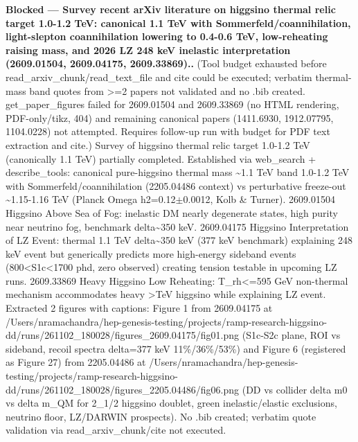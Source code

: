 \documentclass[11pt,a4paper]{article}
\begin{document}
\textbf{Blocked --- Survey recent arXiv literature on higgsino thermal relic target 1.0-1.2 TeV: canonical 1.1 TeV with Sommerfeld/coannihilation, light-slepton coannihilation lowering to 0.4-0.6 TeV, low-reheating raising mass, and 2026 LZ 248 keV inelastic interpretation (2609.01504, 2609.04175, 2609.33869)..} (Tool budget exhausted before read\_arxiv\_chunk/read\_text\_file and cite could be executed; verbatim thermal-mass band quotes from \textgreater{}=2 papers not validated and no .bib created. get\_paper\_figures failed for 2609.01504 and 2609.33869 (no HTML rendering, PDF-only/tikz, 404) and remaining canonical papers (1411.6930, 1912.07795, 1104.0228) not attempted. Requires follow-up run with budget for PDF text extraction and cite.) Survey of higgsino thermal relic target 1.0-1.2 TeV (canonically 1.1 TeV) partially completed. Established via web\_search + describe\_tools: canonical pure-higgsino thermal mass \textasciitilde{}1.1 TeV band 1.0-1.2 TeV with Sommerfeld/coannihilation (2205.04486 context) vs perturbative freeze-out \textasciitilde{}1.15-1.16 TeV (Planck Omega h2=0.12$\pm$0.0012, Kolb \& Turner). 2609.01504 Higgsino Above Sea of Fog: inelastic DM nearly degenerate states, high purity near neutrino fog, benchmark delta\textasciitilde{}350 keV. 2609.04175 Higgsino Interpretation of LZ Event: thermal 1.1 TeV delta\textasciitilde{}350 keV (377 keV benchmark) explaining 248 keV event but generically predicts more high-energy sideband events (800\textless{}S1c\textless{}1700 phd, zero observed) creating tension testable in upcoming LZ runs. 2609.33869 Heavy Higgsino Low Reheating: T\_rh\textless{}=595 GeV non-thermal mechanism accommodates heavy \textgreater{}TeV higgsino while explaining LZ event. Extracted 2 figures with captions: Figure 1 from 2609.04175 at /Users/nramachandra/hep-genesis-testing/projects/ramp-research-higgsino-dd/runs/261102\_180028/figures\_2609.04175/fig01.png (S1c-S2c plane, ROI vs sideband, recoil spectra delta=377 keV 11\%/36\%/53\%) and Figure 6 (registered as Figure 27) from 2205.04486 at /Users/nramachandra/hep-genesis-testing/projects/ramp-research-higgsino-dd/runs/261102\_180028/figures\_2205.04486/fig06.png (DD vs collider delta m0 vs delta m\_QM for 2\_1/2 higgsino doublet, green inelastic/elastic exclusions, neutrino floor, LZ/DARWIN prospects). No .bib created; verbatim quote validation via read\_arxiv\_chunk/cite not executed.
\end{document}
